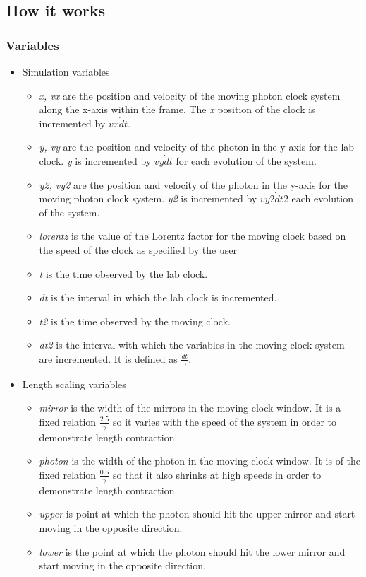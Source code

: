 \subsection*{How it works}
\label{sec-3-3}
\subsubsection*{Variables}
\label{sec-3-3-1}
\begin{itemize}

\item Simulation variables
\label{sec-3-3-1-1}%
\begin{itemize}
\item \emph{x, vx} are the position and velocity of the moving photon clock system along the x-axis within the frame. The \emph{x} position of the clock is incremented by $vx\dot dt$.
\item \emph{y, vy} are the position and velocity of the photon in the y-axis for the lab clock. \emph{y} is incremented by $vy\dot dt$ for each evolution of the system.
\item \emph{y2, vy2} are the position and velocity of the photon in the y-axis for the moving photon clock system. \emph{y2} is incremented by $vy2\dot dt2$ each evolution of the system.
\item \emph{lorentz} is the value of the Lorentz factor for the moving clock based on the speed of the clock as specified by the user
\item \emph{t} is the time observed by the lab clock.
\item \emph{dt} is the interval in which the lab clock is incremented.
\item \emph{t2} is the time observed by the moving clock.
\item \emph{dt2} is the interval with which the variables in the moving clock system are incremented. It is defined as $\frac{dt}{\gamma}$.
\end{itemize}


\item Length scaling variables
\label{sec-3-3-1-2}%
\begin{itemize}
\item \emph{mirror} is the width of the mirrors in the moving clock window. It is a fixed relation $\frac{2.5}{\gamma}$ so it varies with the speed of the system in order to demonstrate length contraction.
\item \emph{photon} is the width of the photon in the moving clock window. It is of the fixed relation $\frac{0.5}{\gamma}$ so that it also shrinks at high speeds in order to demonstrate length contraction.
\item \emph{upper} is point at which the photon should hit the upper mirror and start moving in the opposite direction.
\item \emph{lower} is the point at which the photon should hit the lower mirror and start moving in the opposite direction.
\end{itemize}
\end{itemize} %
